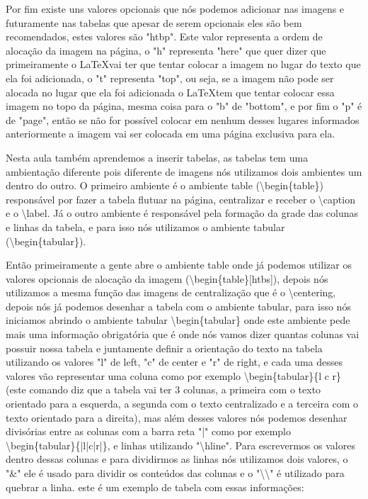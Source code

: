 Por fim existe uns valores opcionais que nós podemos adicionar nas imagens e futuramente nas tabelas que apesar de serem opcionais eles são bem recomendados, estes valores são "htbp". Este valor representa a ordem de alocação da imagem na página, o "h" representa "here" que quer dizer que primeiramente o \LaTeX vai ter que tentar colocar a imagem no lugar do texto que ela foi adicionada, o "t" representa "top", ou seja, se a imagem não pode ser alocada no lugar que ela foi adicionada o \LaTeX tem que tentar colocar essa imagem no topo da página, mesma coisa para o "b" de "bottom", e por fim o "p" é de "page", então se não for possível colocar em nenhum desses lugares informados anteriormente a imagem vai ser colocada em uma página exclusiva para ela.

Nesta aula também aprendemos a inserir tabelas, as tabelas tem uma ambientação diferente pois diferente de imagens nós utilizamos dois ambientes um dentro do outro. O primeiro ambiente é o ambiente table (\textbackslash begin\{table\}) responsável por fazer a tabela flutuar na página, centralizar e receber o \textbackslash caption e o \textbackslash label. Já o outro ambiente é responsável pela formação da grade das colunas e linhas da tabela, e para isso nós utilizamos o ambiente tabular (\textbackslash begin\{tabular\}).

Então primeiramente a gente abre o ambiente table onde já podemos utilizar os valores opcionais de alocação da imagem (\textbackslash begin\{table\}[htbs]), depois nós utilizamos a mesma função das imagens de centralização que é o \textbackslash centering, depois nós já podemos desenhar a tabela com o ambiente tabular, para isso nós iniciamos abrindo o ambiente tabular \textbackslash begin\{tabular\} onde este ambiente pede mais uma informação obrigatória que é onde nós vamos dizer quantas colunas vai possuir nossa tabela e juntamente definir a orientação do texto na tabela utilizando os valores "l" de left, "c" de center e "r" de right, e cada uma desses valores vão representar uma coluna como por exemplo \textbackslash begin\{tabular\}\{l c r\} (este comando diz que a tabela vai ter 3 colunas, a primeira com o texto orientado para a esquerda, a segunda com o texto centralizado e a terceira com o texto orientado para a direita), mas além desses valores nós podemos desenhar divisórias entre as colunas com a barra reta "|" como por exemplo \textbackslash begin\{tabular\}\{|l|c|r|\}, e linhas utilizando "\textbackslash hline". Para escrevermos os valores dentro dessas colunas e para dividirmos as linhas nós utilizamos dois valores, o "\&" ele é usado para dividir os conteúdos das colunas e o "\textbackslash \textbackslash" é utilizado para quebrar a linha. este é um exemplo de tabela com essas informações:

